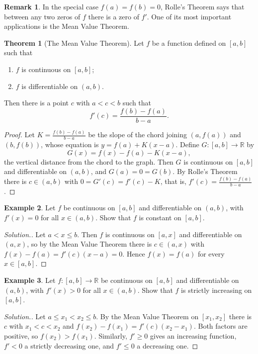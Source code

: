\documentclass[11pt,a4paper]{article}
\numberwithin{equation}{section}
\theoremstyle{definition}
\newtheorem{thm}{Theorem}[subsection]
\newtheorem{exa}[thm]{Example}
\newtheorem*{remark}{Remark}
\newenvironment{solution}
  {\renewcommand{\qedsymbol}{}\begin{proof}[\textit{Solution}.]}
  {\end{proof}}
\begin{document}
\begin{remark}
In the special case $f(a) = f(b) = 0$, Rolle's Theorem says that between any two zeros of $f$ there is a zero of $f'$. One of its most important applications is the Mean Value Theorem.
\end{remark}


\begin{thm}[The Mean Value Theorem]
Let $f$ be a function defined on $[a,b]$ such that
\begin{enumerate}
\item[(i)] $f$ is continuous on $[a,b]$;
\item[(ii)] $f$ is differentiable on $(a,b)$.
\end{enumerate}
Then there is a point $c$ with $a < c < b$ such that
$$f'(c) = \frac{f(b) - f(a) }{b - a} .$$
\end{thm}

\begin{proof}
Let $K = \frac{f(b) - f(a)}{b - a}$ be the slope of the chord joining $(a, f(a))$ and $(b, f(b))$, whose equation is $y = f(a)  + K (x - a)$. Define $G: [a,b] \longrightarrow \mathbb{R}$ by
$$G(x) = f(x) - f(a) - K (x - a),$$
the vertical distance from the chord to the graph. Then $G$ is continuous on $[a,b]$ and differentiable on $(a,b)$, and $G(a) = 0 = G(b)$. By Rolle's Theorem there is $c\in (a,b)$ with $0  = G'(c) = f'(c) - K$, that is, $f'(c) = \frac{f(b) - f(a)}{b - a}$.
\end{proof}


\begin{exa}
Let $f$ be continuous on $[a,b]$ and differentiable on $(a,b)$, with $f'(x) = 0$ for all $x\in (a,b)$. Show that $f$ is constant on $[a,b]$.
\end{exa}

\begin{solution}
Let $a < x \leq b$. Then $f$ is continuous on $[a,x]$ and differentiable on $(a,x)$, so by the Mean Value Theorem there is $c\in (a,x)$ with $f(x) - f(a) = f'(c)(x - a) = 0$. Hence $f(x) = f(a)$ for every $x\in[a,b]$.
\end{solution}


\begin{exa}
Let $f: [a,b]\longrightarrow \mathbb{R}$ be continuous on $[a,b]$ and differentiable on $(a,b)$, with $f'(x) > 0$ for all $x\in(a,b)$. Show that $f$ is strictly increasing on $[a,b]$.
\end{exa}

\begin{solution}
Let $a \leq x_1  < x_2\leq b$. By the Mean Value Theorem on $[x_1,x_2]$ there is $c$ with $x_1 < c < x_2$ and $f(x_2) - f(x_1) = f'(c)(x_2 - x_1)$. Both factors are positive, so $f(x_2) > f(x_1)$. Similarly, $f'\geq0$ gives an increasing function, $f'<0$ a strictly decreasing one, and $f'\leq 0$ a decreasing one.
\end{solution}
\end{document}
